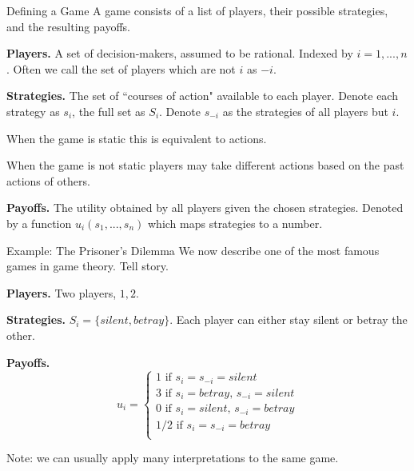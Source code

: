 \documentclass[aspectratio=169]{beamer}
\newenvironment{wideitemize}{\itemize\addtolength{\itemsep}{10pt}}{\enditemize}
\begin{document}
\begin{frame}{Defining a Game}
A game consists of a list of players, their possible strategies, and the resulting payoffs.
\begin{wideitemize}
    \item \textbf{Players.} A set of decision-makers, assumed to be rational. Indexed by $i=1,...,n$. Often we call the set of players which are not $i$ as $-i$.
    \item \textbf{Strategies.} The set of ``courses of action" available to each player. Denote each strategy as $s_i$, the full set as $S_i$. Denote $s_{-i}$ as the strategies of all players but $i$.
    \begin{wideitemize}
        \item When the game is static this is equivalent to actions.
        \item When the game is not static players may take different actions based on the past actions of others.
    \end{wideitemize}
    \item \textbf{Payoffs.} The utility obtained by all players given the chosen strategies. Denoted by a function $u_i(s_1,...,s_n)$ which maps strategies to a number.
\end{wideitemize}
    
\end{frame}
\begin{frame}{Example: The Prisoner's Dilemma}
We now describe one of the most famous games in game theory. Tell story.
\begin{wideitemize}
    \item \textbf{Players.} Two players, $1,2$.
    \item \textbf{Strategies.} $S_i=\{silent,betray\}$. Each player can either stay silent or betray the other.
    \item \textbf{Payoffs.} 
    \[u_i=\begin{cases} 1 \text{ if } s_i=s_{-i}=silent\\
    3 \text{ if } s_i=betray, \, s_{-i}=silent\\
    0 \text{ if } s_i=silent, \, s_{-i}=betray\\
    1/2 \text{ if } s_i=s_{-i}=betray\\
    \end{cases}\]
\end{wideitemize}

Note: we can usually apply many interpretations to the same game.
\end{frame}
\end{document}
